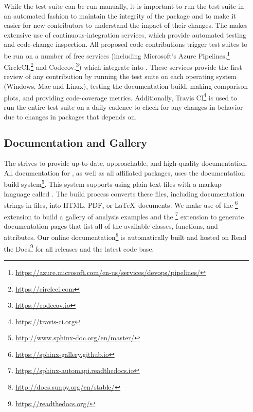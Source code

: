 While the test suite can be run manually, it is important to run the test suite in an automated fashion to maintain the integrity of the package and to make it easier for new contributors to understand the impact of their changes.
The \sunpyproj makes extensive use of continuous-integration services, which provide automated testing and code-change inspection.
All proposed code contributions trigger test suites to be run on a number of free services (including
Microsoft's Azure Pipelines,\footnote{\url{https://azure.microsoft.com/en-us/services/devops/pipelines/}} CircleCI,\footnote{\url{https://circleci.com}} and Codecov,\footnote{\url{https://codecov.io}}) which integrate into \github.
These services provide the first review of any contribution by running the test suite on each operating system (Windows, Mac and Linux), testing the documentation build, making comparison plots, and providing code-coverage metrics.
Additionally, Travis CI\footnote{\url{https://travis-ci.org}} is used to run the entire test suite on a daily cadence to check for any changes in behavior due to changes in packages that \sunpypkg depends on.

\subsection{Documentation and Gallery}
\label{sec:docs}

The \sunpyproj strives to provide up-to-date, approachable, and high-quality documentation.
All documentation for \sunpypkg, as well as all affiliated packages, uses the  documentation build system\footnote{\url{http://www.sphinx-doc.org/en/master/}}.
This system supports using plain text files with a markup language called .
The build process converts these files, including documentation strings in \python files, into HTML, PDF, or \LaTeX\ documents.
We make use of the \footnote{\url{https://sphinx-gallery.github.io}} extension to build a gallery of analysis examples and the \footnote{\url{https://sphinx-automapi.readthedocs.io}} extension to generate documentation pages that list all of the available classes, functions, and attributes.
Our online documentation\footnote{\url{http://docs.sunpy.org/en/stable/}} is automatically built and hosted on Read the Docs\footnote{\url{https://readthedocs.org/}} for all releases and the latest code base.
